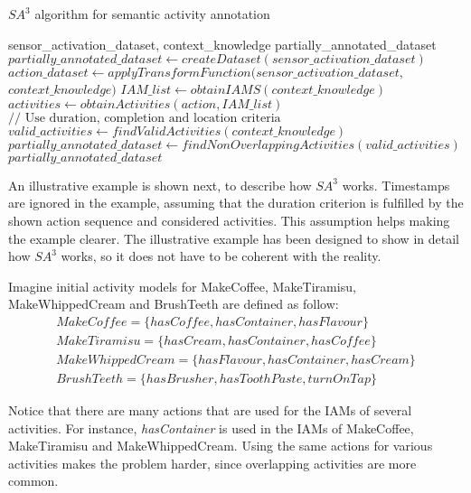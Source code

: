 \begin{algorithm}
 \caption{$SA^3$ algorithm for semantic activity annotation}
 \label{alg:sa3}
 \begin{algorithmic}
 \REQUIRE sensor\_activation\_dataset, context\_knowledge
 \ENSURE partially\_annotated\_dataset
 \STATE $partially\_annotated\_dataset \leftarrow createDataset(sensor\_activation\_dataset)$
 \STATE $action\_dataset \leftarrow applyTransformFunction(sensor\_activation\_dataset,$ 
 $context\_knowledge)$
 \STATE $IAM\_list \leftarrow obtainIAMS(context\_knowledge)$
    \STATE $activities \leftarrow obtainActivities(action, IAM\_list)$
  \ENDIF
    \STATE $// \text{ Use duration, completion and location criteria}$
    \STATE $valid\_activities \leftarrow findValidActivities(context\_knowledge)$
  \ENDFOR
 \ENDFOR
 \STATE $partially\_annotated\_dataset \leftarrow findNonOverlappingActivities(valid\_activities)$
 \RETURN $partially\_annotated\_dataset$
 \end{algorithmic}
\end{algorithm}

An illustrative example is shown next, to describe how $SA^3$ works. Timestamps are ignored in the example, assuming that the duration criterion is fulfilled by the shown action sequence and considered activities. This assumption helps making the example clearer. The illustrative example has been designed to show in detail how $SA^3$ works, so it does not have to be coherent with the reality. 

Imagine initial activity models for MakeCoffee, MakeTiramisu, MakeWhippedCream and BrushTeeth are defined as follow:
 \begin{equation*}
  \begin{split}
  MakeCoffee =\{hasCoffee, hasContainer, hasFlavour\} \\
  MakeTiramisu = \{hasCream, hasContainer, hasCoffee\} \\
  MakeWhippedCream = \{hasFlavour, hasContainer, hasCream\} \\
  BrushTeeth = \{hasBrusher, hasToothPaste, turnOnTap\} 
  \end{split}
 \end{equation*} 
 
Notice that there are many actions that are used for the IAMs of several activities. For instance, \textit{hasContainer} is used in the IAMs of MakeCoffee, MakeTiramisu and MakeWhippedCream. Using the same actions for various activities makes the problem harder, since overlapping activities are more common.

